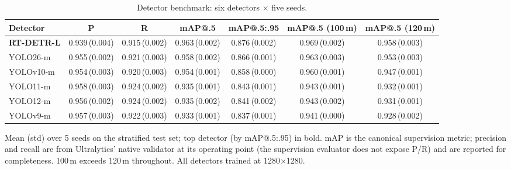 \begin{table}[ht]
  \centering
  \caption{Detector benchmark: six detectors $\times$ five seeds.}
  \label{tab:detectors}
  \begin{tabular}{lcccccc}
    \toprule
    Detector & P & R & mAP@.5 & mAP@.5:.95 & mAP@.5 (100\,m) & mAP@.5 (120\,m) \\
    \midrule
    \textbf{RT-DETR-L} & 0.939\,(0.004) & 0.915\,(0.002) & 0.963\,(0.002) & 0.876\,(0.002) & 0.969\,(0.002) & 0.958\,(0.003) \\
    YOLO26-m & 0.955\,(0.002) & 0.921\,(0.003) & 0.958\,(0.002) & 0.866\,(0.001) & 0.963\,(0.003) & 0.953\,(0.003) \\
    YOLOv10-m & 0.954\,(0.003) & 0.920\,(0.003) & 0.954\,(0.001) & 0.858\,(0.000) & 0.960\,(0.001) & 0.947\,(0.001) \\
    YOLO11-m & 0.958\,(0.003) & 0.924\,(0.002) & 0.935\,(0.001) & 0.843\,(0.001) & 0.943\,(0.001) & 0.932\,(0.001) \\
    YOLO12-m & 0.956\,(0.002) & 0.924\,(0.002) & 0.935\,(0.002) & 0.841\,(0.002) & 0.943\,(0.002) & 0.931\,(0.001) \\
    YOLOv9-m & 0.957\,(0.003) & 0.922\,(0.003) & 0.933\,(0.001) & 0.837\,(0.001) & 0.941\,(0.000) & 0.928\,(0.002) \\
    \bottomrule
  \end{tabular}
  \par\smallskip
  \footnotesize Mean (std) over 5 seeds on the stratified test set; top detector (by mAP@.5:.95) in bold. mAP is the canonical supervision metric; precision and recall are from Ultralytics' native validator at its operating point (the supervision evaluator does not expose P/R) and are reported for completeness. 100\,m exceeds 120\,m throughout. All detectors trained at 1280$\times$1280.
\end{table}
